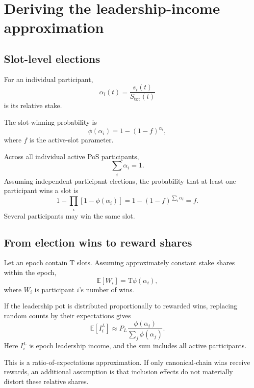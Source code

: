 \documentclass[11pt,a4paper]{article}
\newcommand{\Tau}{\mathrm{T}}
\begin{document}
\section{Deriving the leadership-income approximation}
\subsection{Slot-level elections}
For an individual participant,
\begin{equation}
\alpha_i(t)=\frac{s_i(t)}{S_{\mathrm{tot}}(t)}
\end{equation}
is its relative stake.

The slot-winning probability is
\begin{equation}
\boxed{\phi(\alpha_i)=1-(1-f)^{\alpha_i},}
\end{equation}
where $f$ is the active-slot parameter.

Across all individual active PoS participants,
\begin{equation}
\sum_i\alpha_i=1.
\end{equation}
Assuming independent participant elections, the probability that at least one participant wins a slot is
\begin{equation}
1-\prod_i[1-\phi(\alpha_i)]=1-(1-f)^{\sum_i\alpha_i}=f.
\end{equation}
Several participants may win the same slot.

\subsection{From election wins to reward shares}
Let an epoch contain $\Tau$ slots. Assuming approximately constant stake shares within the epoch,
\begin{equation}
\mathbb E[W_i]=\Tau\phi(\alpha_i),
\end{equation}
where $W_i$ is participant $i$'s number of wins.

If the leadership pot is distributed proportionally to rewarded wins, replacing random counts by their expectations gives
\begin{equation}
\mathbb E[I_i^L]\approx P_L\frac{\phi(\alpha_i)}{\sum_j\phi(\alpha_j)}.
\end{equation}
Here $I_i^L$ is epoch leadership income, and the sum includes all active participants.

This is a ratio-of-expectations approximation. If only canonical-chain wins receive rewards, an additional assumption is that inclusion effects do not materially distort these relative shares.
\end{document}

